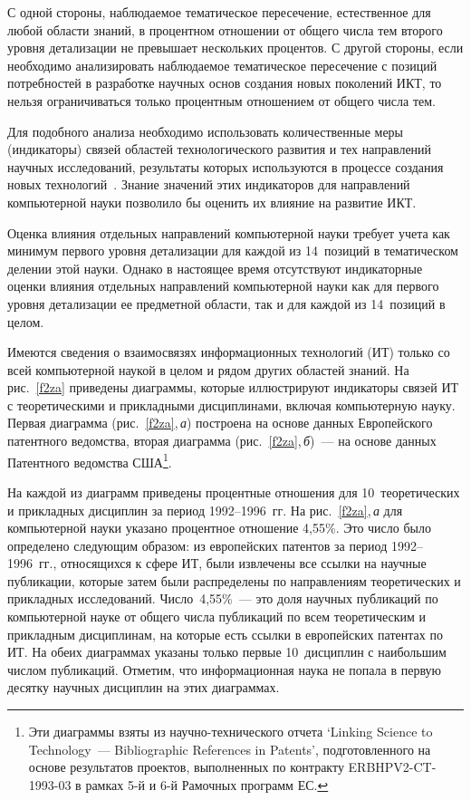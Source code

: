  \begin{multicols}{2}


      С одной стороны, наблюдаемое тематическое пересечение, естественное для любой
области знаний, в процентном отношении от общего числа тем второго уровня детализации не
превышает нескольких процентов. С другой стороны, если необходимо анализировать
наблюдаемое тематическое пересечение с позиций потребностей в разработке научных основ
создания новых поколений ИКТ, то нельзя ограничиваться только процентным отношением от
общего числа тем.

      Для подобного анализа необходимо использовать количественные меры (индикаторы)
связей областей технологического развития и тех на\-прав\-ле\-ний научных исследований,
результаты которых используются в процессе создания новых технологий~\cite{34za}.
Знание значений этих индикаторов для направлений компьютерной науки позволило бы
оценить их влияние на развитие ИКТ.

      Оценка влияния отдельных направлений компьютерной науки требует учета как
минимум первого уровня детализации для каждой из 14~позиций в тематическом делении этой
науки. Однако в настоящее время отсутствуют индикаторные оценки влияния отдельных
направлений компьютерной науки как для первого уровня детализации ее предметной области,
так и для каждой из 14~позиций в целом.
{

}

      Имеются сведения о взаимосвязях информационных технологий (ИТ) только со всей
компьютерной наукой в целом и рядом других областей знаний. На рис.~\ref{f2za} 
приведены диаграммы, которые иллюстрируют индикаторы связей ИТ с теоретическими и
прикладными дисциплинами, включая компьютерную науку. Первая диаграмма
(рис.~\ref{f2za},\,\textit{а}) построена на основе данных Европейского патентного ведомства, вторая
диаграмма (рис.~\ref{f2za},\,\textit{б})~--- на основе данных Патентного ведомства США\footnote{Эти
диаграммы взяты из научно-технического отчета `Linking Science to Technology~--- Bibliographic
References in Patents', подготовленного на основе результатов проектов, выполненных по контракту
ERBHPV2-CT-1993-03 в рамках 5-й и 6-й Рамочных программ ЕС.}.

      На каждой из диаграмм приведены процентные отношения для 10~теоретических и
прикладных дисциплин за период 1992--1996~гг. На рис.~\ref{f2za},\,\textit{а} для компьютерной науки
указано процентное отношение 4,55\%. Это число было определено следующим образом: из
европейских патентов за период 1992--1996~гг., относящихся к сфере ИТ, были извлечены все
ссылки на научные публикации, которые затем были распределены по направлениям
теоретических и прикладных исследований. Число~4,55\%~--- это доля научных публикаций по
компьютерной науке от общего числа публикаций по всем теоретическим и прикладным
дисциплинам, на которые есть ссылки в европейских патентах по ИТ. На обеих диаграммах
указаны только первые 10~дисциплин с наибольшим числом публикаций. Отметим, что
информационная наука не попала в первую десятку научных дисциплин на этих диаграммах.


\end{multicols}
